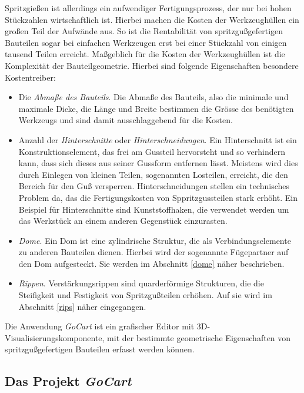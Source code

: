 Spritzgie{\ss}en ist allerdings ein aufwendiger Fertigungsprozess, der nur bei hohen St\"uckzahlen wirtschaftlich ist. Hierbei machen die Kosten der Werkzeugh\"ullen ein gro{\ss}en Teil der Aufw\"ande aus. So ist die Rentabilit\"at von spritzgu{\ss}gefertigen Bauteilen sogar bei einfachen Werkzeugen erst bei einer St\"uckzahl von einigen tausend Teilen erreicht. 
Ma{\ss}geblich f\"ur die Kosten der Werkzeugh\"ullen ist die Komplexit\"at der Bauteilgeometrie. Hierbei sind folgende Eigenschaften besondere Kostentreiber: 

\begin{itemize}
\item Die \textit{Abma{\ss}e des Bauteils}. Die Abma{\ss}e des Bauteils, also die minimale und maximale Dicke, die L\"ange und Breite bestimmen die Gr\"osse des ben\"otigten Werkzeugs und sind damit ausschlaggebend f\"ur die Kosten.

\item Anzahl der \textit{Hinterschnitte} oder \textit{Hinterschneidungen}. Ein Hinterschnitt ist ein Konstruktionselement, das frei am Gussteil hervorsteht und so verhindern kann, dass sich dieses aus seiner Gussform entfernen lässt. Meistens wird dies durch Einlegen von kleinen Teilen, sogenannten Losteilen, erreicht, die den Bereich für den Gu{\ss} versperren. Hinterschneidungen stellen ein technisches Problem da, das die Fertigungskosten von Sppritzgussteilen stark erh\"oht. Ein Beispiel f\"ur Hinterschnitte sind Kunststoffhaken, die verwendet werden um das Werkst\"uck an einem anderen Gegenstück einzurasten. 

\item \textit{Dome}. Ein Dom ist eine zylindrische Struktur, die als Verbindungselemente zu anderen Bauteilen dienen. Hierbei wird der sogenannte F\"ugepartner auf den Dom aufgesteckt. Sie werden im Abschnitt \ref{dome} n\"aher beschrieben.

\item \textit{Rippen}. Verst\"arkungsrippen sind quarderf\"ormige Strukturen, die die Steifigkeit und Festigkeit von Spritzgu{\ss}teilen erhöhen. Auf sie wird im Abschnitt \ref{rips} n\"aher eingegangen.

\end{itemize}

Die Anwendung \textit{GoCart} ist ein grafischer Editor mit 3D-Visualisierungskomponente, mit der bestimmte geometrische Eigenschaften von spritzgu{\ss}gefertigen Bauteilen erfasst werden k\"onnen.

\subsection{Das Projekt \textit{GoCart}}
\label{goCart}

